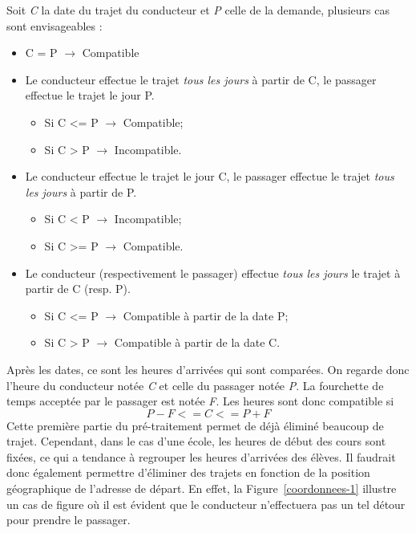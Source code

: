 \documentclass[12pt, a4paper, oneside]{article}
\begin{document}
     Soit \textit{C} la date du trajet du conducteur et \textit{P} celle de la demande, plusieurs cas sont envisageables :\\
    \begin{itemize}
        \item C = P $\rightarrow$ Compatible
        \item Le conducteur effectue le trajet \textit{tous les jours} à partir de C, le passager effectue le trajet le jour P. 
        \begin{itemize}
            \item Si C <= P $\rightarrow$ Compatible;
            \item Si C > P $\rightarrow$ Incompatible.
        \end{itemize}
        \item Le conducteur effectue le trajet le jour C, le passager effectue le trajet \textit{tous les jours} à partir de P.
        \begin{itemize}
            \item Si C < P $\rightarrow$ Incompatible; 
            \item Si C >= P $\rightarrow$ Compatible.
        \end{itemize}
        \item Le conducteur (respectivement le passager) effectue \textit{tous les jours} le trajet à partir de C (resp. P).
        \begin{itemize}
            \item Si C <= P $\rightarrow$ Compatible à partir de la date P;
            \item Si C > P $\rightarrow$ Compatible à partir de la date C.\\
        \end{itemize}
    \end{itemize}
    Après les dates, ce sont les heures d'arrivées qui sont comparées. On regarde donc l'heure du conducteur notée \textit{C} et celle du passager notée \textit{P}. La fourchette de temps acceptée par le passager est notée \textit{F}. Les heures sont donc compatible si 
    \begin{equation*}
        P-F <= C <= P+F
    \end{equation*}
    Cette première partie du pré-traitement permet de déjà éliminé beaucoup de trajet. Cependant, dans le cas d'une école, les heures de début des cours sont fixées, ce qui a tendance à regrouper les heures d'arrivées des élèves. Il faudrait donc également permettre d'éliminer des trajets en fonction de la position géographique de l'adresse de départ. En effet, la Figure~\ref{coordonnees-1} illustre un cas de figure où il est évident que le conducteur n'effectuera pas un tel détour pour prendre le passager. 
\end{document}
